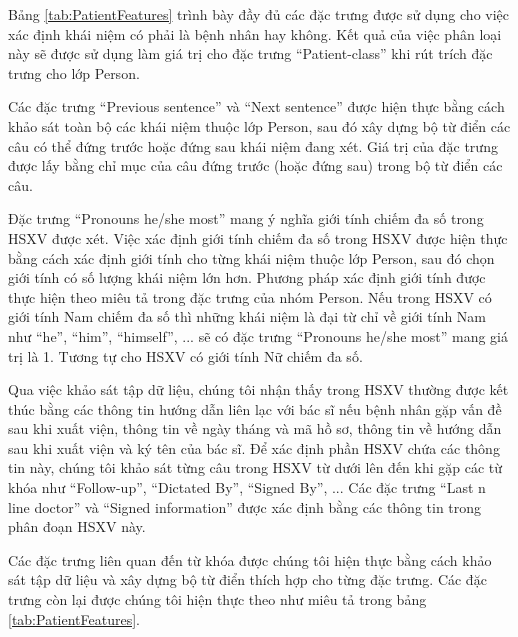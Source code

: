 Bảng \ref{tab:PatientFeatures} trình bày đầy đủ các đặc trưng được sử dụng cho việc xác định khái niệm có phải là bệnh nhân hay không. Kết quả của việc phân loại này sẽ được sử dụng làm giá trị cho đặc trưng ``Patient-class'' khi rút trích đặc trưng cho lớp Person.

Các đặc trưng ``Previous sentence'' và ``Next sentence'' được hiện thực bằng cách khảo sát toàn bộ các khái niệm thuộc lớp Person, sau đó xây dựng bộ từ điển các câu có thể đứng trước hoặc đứng sau khái niệm đang xét. Giá trị của đặc trưng được lấy bằng chỉ mục của câu đứng trước (hoặc đứng sau) trong bộ từ điển các câu.

Đặc trưng ``Pronouns he/she most'' mang ý nghĩa giới tính chiếm đa số trong HSXV được xét. Việc xác định giới tính chiếm đa số trong HSXV được hiện thực bằng cách xác định giới tính cho từng khái niệm thuộc lớp Person, sau đó chọn giới tính có số lượng khái niệm lớn hơn. Phương pháp xác định giới tính được thực hiện theo miêu tả trong đặc trưng của nhóm Person. Nếu trong HSXV có giới tính Nam chiếm đa số thì những khái niệm là đại từ chỉ về giới tính Nam như ``he'', ``him'', ``himself'', ... sẽ có đặc trưng ``Pronouns he/she most'' mang giá trị là 1. Tương tự cho HSXV có giới tính Nữ chiếm đa số.

Qua việc khảo sát tập dữ liệu, chúng tôi nhận thấy trong HSXV thường được kết thúc bằng các thông tin hướng dẫn liên lạc với bác sĩ nếu bệnh nhân gặp vấn đề sau khi xuất viện, thông tin về ngày tháng và mã hồ sơ, thông tin về hướng dẫn sau khi xuất viện và ký tên của bác sĩ. Để xác định phần HSXV chứa các thông tin này, chúng tôi khảo sát từng câu trong HSXV từ dưới lên đến khi gặp các từ khóa như ``Follow-up'', ``Dictated By'', ``Signed By'', ... Các đặc trưng ``Last n line doctor'' và ``Signed information'' được xác định bằng các thông tin trong phân đoạn HSXV này.

Các đặc trưng liên quan đến từ khóa được chúng tôi hiện thực bằng cách khảo sát tập dữ liệu và xây dựng bộ từ điển thích hợp cho từng đặc trưng. Các đặc trưng còn lại được chúng tôi hiện thực theo như miêu tả trong bảng \ref{tab:PatientFeatures}.

